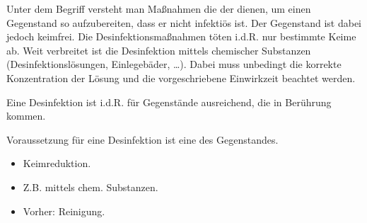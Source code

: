 {
Unter dem Begriff  versteht man Maßnahmen die der
 dienen, um einen Gegenstand so aufzubereiten, dass er
 nicht infektiös ist. Der Gegenstand ist
dabei jedoch  keimfrei. Die Desinfektionsmaßnahmen töten i.d.R. nur
bestimmte Keime ab. Weit verbreitet ist die Desinfektion mittels chemischer
Substanzen (Desinfektionslösungen, Einlegebäder, \ldots). Dabei muss unbedingt
die korrekte Konzentration der Lösung und die vorgeschriebene Einwirkzeit
beachtet werden.

Eine Desinfektion ist i.d.R. für Gegenstände ausreichend, die  in Berührung kommen.

Voraussetzung für eine Desinfektion ist eine  des
Gegenstandes.

 }{
\begin{itemize}
  \item Keimreduktion.
  \item Z.B. mittels chem. Substanzen.
  \item Vorher: Reinigung.
\end{itemize}
}{}{}{}


